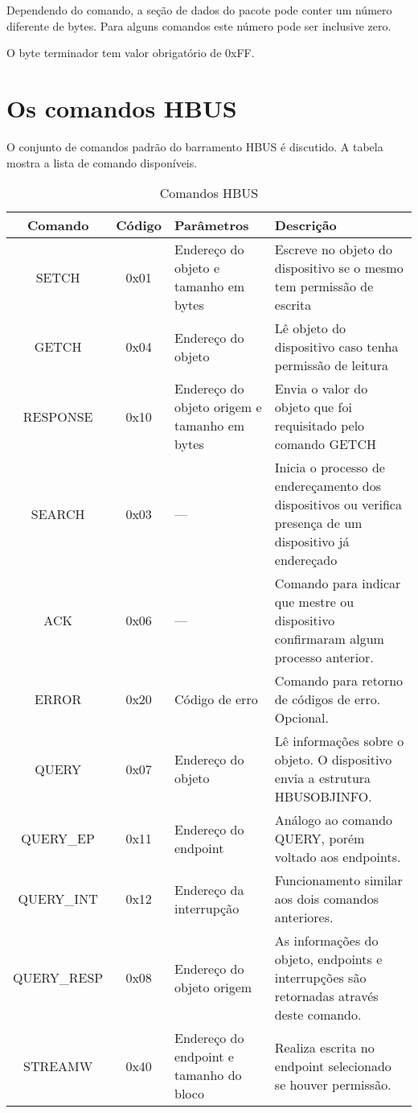 \documentclass[11pt]{report}
\begin{document}
Dependendo do comando, a seção de dados do pacote pode conter um número diferente de bytes. Para alguns comandos este número pode ser inclusive zero.

O byte terminador tem valor obrigatório de 0xFF.

\section{Os comandos HBUS}

O conjunto de comandos padrão do barramento HBUS é discutido. A tabela mostra a lista de comando disponíveis.

\begin{table}[H]
\centering
\caption{Comandos HBUS}
\begin{tabular}{c c p{4cm} p{6cm}}
\hline
Comando	 &	 Código 		&	Parâmetros				&	 Descrição\\
\hline
SETCH	&	0x01			&	Endereço	 do objeto e tamanho em bytes		&	Escreve no objeto do dispositivo se o mesmo tem permissão de escrita\\
GETCH	&	0x04			&	Endereço do objeto		&	Lê objeto do dispositivo caso tenha permissão de leitura\\
RESPONSE&	0x10			&	Endereço do objeto origem e tamanho em bytes & Envia o valor do objeto que foi requisitado pelo comando GETCH\\
SEARCH	&	0x03			&	---						&	Inicia o processo de endereçamento dos dispositivos ou verifica presença de um dispositivo já endereçado\\
ACK		&	0x06			&	---						&	Comando para indicar que mestre ou dispositivo confirmaram algum processo anterior.\\
ERROR	&	0x20			&	Código de erro			&	Comando para retorno de códigos de erro. Opcional.\\
QUERY	&	0x07		&	Endereço do objeto		&	Lê informações sobre o objeto. O dispositivo envia a estrutura HBUSOBJINFO.\\
QUERY\_EP &	0x11		&	Endereço do endpoint		&	Análogo ao comando QUERY, porém voltado aos endpoints.\\
QUERY\_INT&	0x12		&	Endereço da interrupção	&	Funcionamento similar aos dois comandos anteriores.\\
QUERY\_RESP & 0x08		&	Endereço do objeto origem & As informações do objeto, endpoints e interrupções são retornadas através deste comando.\\
STREAMW	&	0x40			&	Endereço do endpoint e tamanho do bloco		&	Realiza escrita no endpoint selecionado se houver permissão.\\

\end{tabular}
\end{table}
\end{document}
